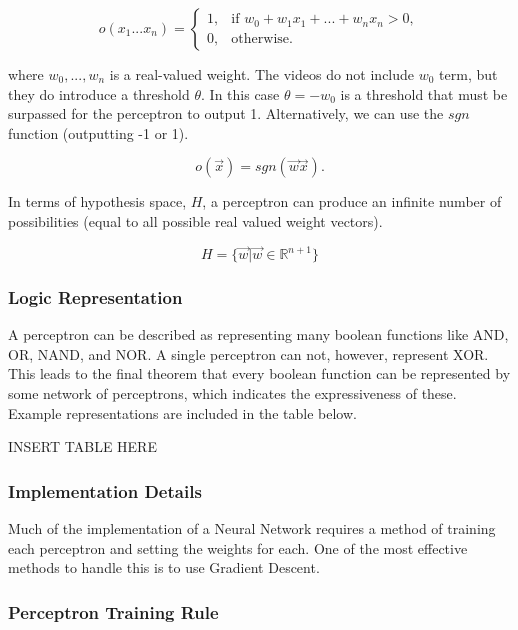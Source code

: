 \documentclass[11pt]{article}
\begin{document}
\begin{equation}
o(x_1...x_n) =
    \begin{cases}
            1, &         \text{if } w_0+w_1x_1+...+w_nx_n>0,\\
            0, &         \text{otherwise}.
    \end{cases}
\end{equation}

where $w_0,...,w_n$ is a real-valued weight. The videos do not include $w_0$ term, but they do introduce a threshold $\theta$. In this case $\theta = -w_0$ is a threshold that must be surpassed for the perceptron to output 1. Alternatively, we can use the $sgn$ function (outputting -1 or 1).

\begin{equation}
o(\vec{x}) = sgn(\vec{w}\vec{x}).
\end{equation}

In terms of hypothesis space, $H$, a perceptron can produce an infinite number of possibilities (equal to all possible real valued weight vectors).

\begin{equation}
H =\{\vec{w} | \vec{w} \in \mathbb{R}^{n+1} \}
\end{equation}

\subsubsection*{Logic Representation}

A perceptron can be described as representing many boolean functions like AND, OR, NAND, and NOR. A single perceptron can not, however, represent XOR. This leads to the final theorem that every boolean function can be represented by some network of perceptrons, which indicates the expressiveness of these. Example representations are included in the table below.

INSERT TABLE HERE

\subsubsection{Implementation Details}

Much of the implementation of a Neural Network requires a method of training each perceptron and setting the weights for each. One of the most effective methods to handle this is to use Gradient Descent.

\subsubsection*{Perceptron Training Rule}
\end{document}

